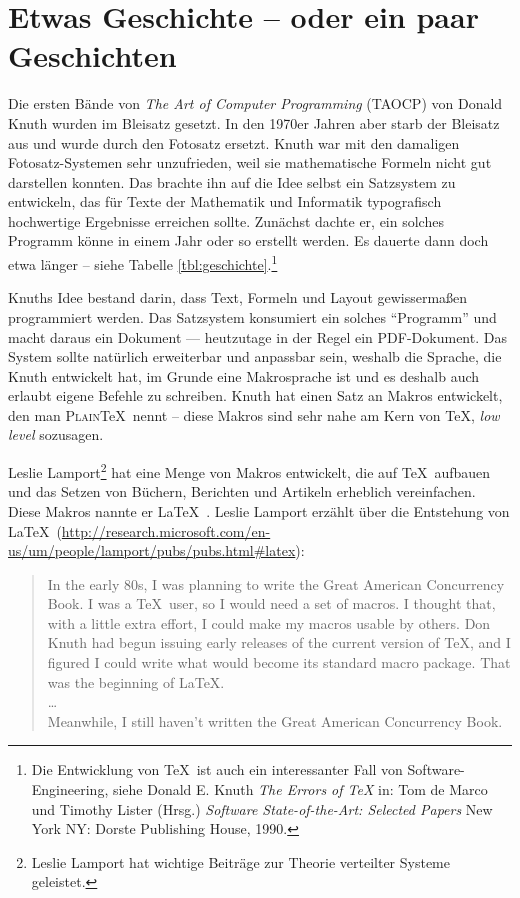 \section{Etwas Geschichte -- oder ein paar Geschichten}

Die ersten Bände von \emph{The Art of Computer Programming}
(\textsc{TAOCP}) von Donald Knuth wurden im Bleisatz gesetzt. In den
1970er Jahren aber starb der Bleisatz aus und wurde durch den Fotosatz
ersetzt. Knuth war mit den damaligen Fotosatz-Systemen sehr unzufrieden,
weil sie mathematische Formeln nicht gut darstellen konnten. Das brachte
ihn auf die Idee selbst ein Satzsystem zu entwickeln, das für
Texte der Mathematik und Informatik typografisch hochwertige Ergebnisse
erreichen sollte. Zunächst dachte er, ein solches Programm könne in
einem Jahr oder so erstellt werden. Es dauerte dann doch etwa
länger -- siehe Tabelle \ref{tbl:geschichte}.\footnote{ Die Entwicklung
von \TeX\ ist auch ein interessanter Fall von Software-Engineering,
    siehe Donald E. Knuth \emph{The Errors of \TeX} in: Tom de Marco und
    Timothy Lister (Hrsg.) \emph{Software State-of-the-Art: Selected
    Papers} New York NY: Dorste Publishing House, 1990.}

Knuths Idee \cite{knuth99} bestand darin, dass Text, Formeln und Layout
gewissermaßen programmiert werden. Das Satzsystem konsumiert ein solches
\enquote{Programm} und macht daraus ein Dokument --- heutzutage in der
Regel ein PDF-Dokument. Das System sollte natürlich erweiterbar und
anpassbar sein, weshalb die Sprache, die Knuth entwickelt hat, im Grunde
eine Makrosprache ist und es deshalb auch erlaubt eigene Befehle zu
schreiben. Knuth hat einen Satz an Makros entwickelt, den man
\textsc{Plain}\kern2pt\TeX\ nennt -- diese Makros sind sehr nahe am Kern
von \TeX, \emph{low level} sozusagen.

Leslie Lamport\footnote{ Leslie Lamport hat wichtige Beiträge zur
Theorie verteilter Systeme geleistet.} hat eine Menge von Makros
entwickelt, die auf \TeX\ aufbauen und das Setzen von Büchern, Berichten
und Artikeln erheblich vereinfachen. Diese Makros nannte er \LaTeX\
\cite{lamport94}. Leslie Lamport erzählt über die Entstehung von
\LaTeX\
(\url{http://research.microsoft.com/en-us/um/people/lamport/pubs/pubs.html#latex}):

\begin{quote}
    In the early 80s, I was planning to write the Great American Concurrency
    Book. I was a \TeX\ user, so I would need a set of macros. I thought
    that, with a little extra effort, I could make my macros usable by
    others. Don Knuth had begun issuing early releases of the current
    version of \TeX, and I figured I could write what would become its
    standard macro package. That was the beginning of \LaTeX.    \\
    \dots\\
    Meanwhile, I still haven't written the Great American Concurrency
    Book.
\end{quote}

